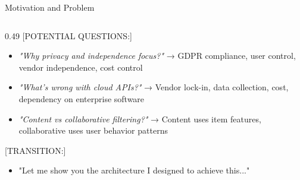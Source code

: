 \begin{frame}{Motivation and Problem}
{\begin{columns}[T]
    \begin{column}{0.49\textwidth}
      [POTENTIAL QUESTIONS:]
      \begin{itemize}
        \item \textit{"Why privacy and independence focus?"} → GDPR compliance, user control, vendor independence, cost control
        \item \textit{"What's wrong with cloud APIs?"} → Vendor lock-in, data collection, cost, dependency on enterprise software
        \item \textit{"Content vs collaborative filtering?"} → Content uses item features, collaborative uses user behavior patterns
      \end{itemize}
      
      \vspace{0.2cm}
      [TRANSITION:]
      \begin{itemize}
        \item "Let me show you the architecture I designed to achieve this..."
      \end{itemize}
    \end{column}
  \end{columns}
}
\end{frame}